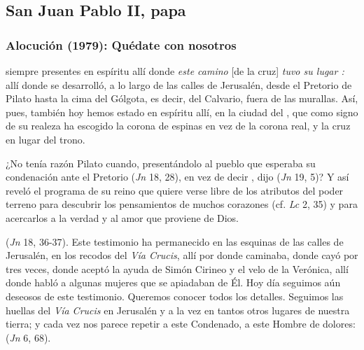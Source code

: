 \newsection
\subsection{San Juan Pablo II, papa}

\subsubsection{Alocución (1979): Quédate con nosotros}


\begin{body}
 siempre presentes en espíritu allí donde \textit{este camino} [de la cruz] \textit{tuvo su lugar :} allí donde se desarrolló, a lo largo de las calles de Jerusalén, desde el Pretorio de Pilato hasta la cima del Gólgota, es decir, del Calvario, fuera de las murallas. Así, pues, también hoy hemos estado en espíritu allí, en la ciudad del , que como signo de su realeza ha escogido la corona de espinas en vez de la corona real, y la cruz en lugar del trono.

¿No tenía razón Pilato cuando, presentándolo al pueblo que esperaba su condenación ante el Pretorio  (\textit{Jn} 18, 28), en vez de decir , dijo  (\textit{Jn} 19, 5)? Y así reveló el programa de su reino que quiere verse libre de los atributos del poder terreno para descubrir los pensamientos de muchos corazones (cf. \textit{Lc} 2, 35) y para acercarlos a la verdad y al amor que proviene de Dios.

 (\textit{Jn} 18, 36-37). Este testimonio ha permanecido en las esquinas de las calles de Jerusalén, en los recodos del \textit{Vía Crucis}, allí por donde caminaba, donde cayó por tres veces, donde aceptó la ayuda de Simón Cirineo y el velo de la Verónica, allí donde habló a algunas mujeres que se apiadaban de Él. Hoy día seguimos aún deseosos de este testimonio. Queremos conocer todos los detalles. Seguimos las huellas del \textit{Vía Crucis} en Jerusalén y a la vez en tantos otros lugares de nuestra tierra; y cada vez nos parece repetir a este Condenado, a este Hombre de dolores:  (\textit{Jn} 6, 68).


\end{body}
